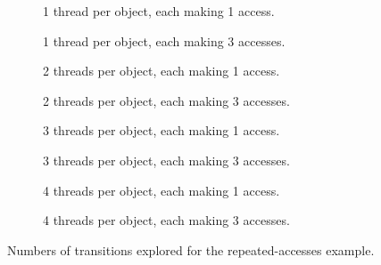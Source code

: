 \documentclass[12pt,a4paper,twoside,openright]{report}
\newenvironment{figtile} %
{\begin{subfigure}{0.48\textwidth}
		\def\svgwidth{\textwidth}
		\captionsetup{font=footnotesize}
	}
	{\end{subfigure}}
\begin{document}
\begin{figure}
	\centering
	\footnotesize
	\begin{figtile}
		
		\caption{1 thread per object,
			each making 1 access.}
	\end{figtile}%
	\quad
	\begin{figtile}
		
		\caption{1 thread per object,
			each making 3 accesses.}
	\end{figtile}
	\begin{figtile}
		
		\caption{2 threads per object,
			each making 1 access.}
	\end{figtile}%
	\quad
	\begin{figtile}
		
		\caption{2 threads per object,
			each making 3 accesses.}
	\end{figtile}
	\begin{figtile}
		
		\caption{3 threads per object,
			each making 1 access.}
	\end{figtile}%
	\quad
	\begin{figtile}
		
		\caption{3 threads per object,
			each making 3 accesses.}
	\end{figtile}
	\begin{figtile}
		
		\caption{4 threads per object,
			each making 1 access.}
	\end{figtile}%
	\quad
	\begin{figtile}
		
		\caption{4 threads per object,
			each making 3 accesses.}
		\label{fig:repeated-access-trans-h}
	\end{figtile}
	\caption{Numbers of transitions
		explored for the repeated-accesses example.}
	\label{fig:repeated-access-trans}
\end{figure}
\end{document}

